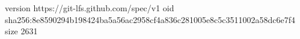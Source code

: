 version https://git-lfs.github.com/spec/v1
oid sha256:8e8590294b198424ba5a56ac2958cf4a836c281005e8c5c3511002a58dc6e7f4
size 2631
